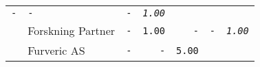 \documentclass[11pt,A4paper,]{article}
\begin{document}
\begin{longtable}[]{@{}llrrrrr@{}}
\begin{minipage}[t]{0.14\columnwidth}
\texttt{-}\strut
\end{minipage} & \begin{minipage}[t]{0.14\columnwidth}\raggedleft\strut
\texttt{-}\strut
\end{minipage} & \begin{minipage}[t]{0.14\columnwidth}\raggedleft\strut
\texttt{-}\strut
\end{minipage} & \begin{minipage}[t]{0.14\columnwidth}\raggedleft\strut
\emph{\texttt{1.00}}\strut
\end{minipage}\tabularnewline
\begin{minipage}[t]{0.14\columnwidth}\raggedright\strut
\strut
\end{minipage} & \begin{minipage}[t]{0.14\columnwidth}\raggedright\strut
Forskning Partner\strut
\end{minipage} & \begin{minipage}[t]{0.14\columnwidth}\raggedleft\strut
\texttt{-}\strut
\end{minipage} & \begin{minipage}[t]{0.14\columnwidth}\raggedleft\strut
\texttt{1.00}\strut
\end{minipage} & \begin{minipage}[t]{0.14\columnwidth}\raggedleft\strut
\texttt{-}\strut
\end{minipage} & \begin{minipage}[t]{0.14\columnwidth}\raggedleft\strut
\texttt{-}\strut
\end{minipage} & \begin{minipage}[t]{0.14\columnwidth}\raggedleft\strut
\emph{\texttt{1.00}}\strut
\end{minipage}\tabularnewline
\begin{minipage}[t]{0.14\columnwidth}\raggedright\strut
\strut
\end{minipage} & \begin{minipage}[t]{0.14\columnwidth}\raggedright\strut
Furveric AS\strut
\end{minipage} & \begin{minipage}[t]{0.14\columnwidth}\raggedleft\strut
\texttt{-}\strut
\end{minipage} & \begin{minipage}[t]{0.14\columnwidth}\raggedleft\strut
\texttt{-}\strut
\end{minipage} & \begin{minipage}[t]{0.14\columnwidth}\raggedleft\strut
\texttt{5.00}\strut
\end{minipage} & \begin{minipage}[t]{0.14\columnwidth}\raggedleft\strut

\end{minipage}
\end{longtable}
\end{document}
